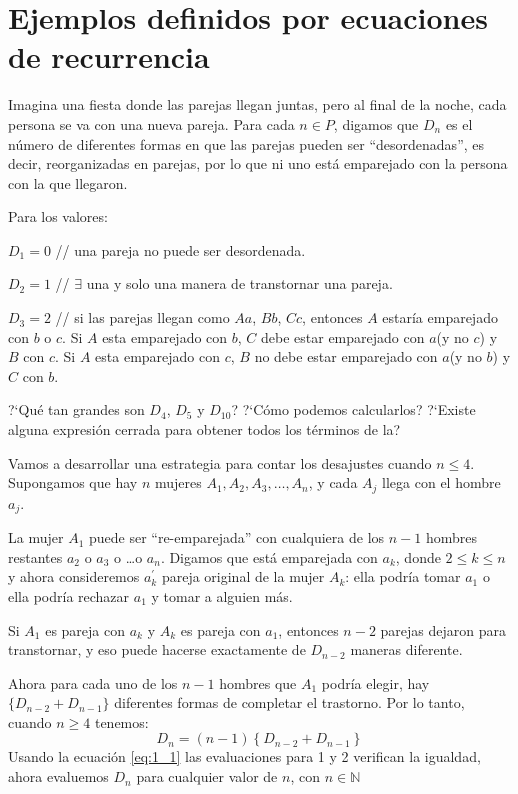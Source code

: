 \section{Ejemplos definidos por ecuaciones de recurrencia}
\begin{example}{}
	Imagina una fiesta donde las parejas llegan juntas, pero al final de la noche, cada persona se va con una nueva pareja. Para cada $n\in P$, digamos que $D_{n}$ es el número de diferentes formas en que las parejas pueden ser ``desordenadas'', es decir, reorganizadas en parejas, por lo que ni uno está emparejado con la persona con la que llegaron.

	Para los valores:

	$D_{1} = 0$  // una pareja no puede ser desordenada.

	$D_{2} = 1$  // $\exists$ una y solo una manera de transtornar una pareja.

	$D_{3} = 2$  // si las parejas llegan como $Aa$, $Bb$, $Cc$, entonces $A$ estaría emparejado con $b$ o $c$. Si $A$ esta emparejado con $b$, $C$ debe estar emparejado con $a$(y no $c$) y $B$ con $c$. Si $A$ esta emparejado con $c$, $B$ no debe estar emparejado con $a$(y no $b$) y $C$ con $b$.

	?`Qué tan grandes son $D_{4}$, $D_{5}$ y $D_{10}$? ?`Cómo podemos calcularlos? ?`Existe alguna expresión cerrada para obtener todos los términos de la? %

	Vamos a desarrollar una estrategia para contar los desajustes cuando $n\leq4$. Supongamos que hay $n$ mujeres $A_{1},A_{2},A_{3},\ldots,A_{n}$, y cada $A_{j}$ llega con el hombre $a_{j}$.

	La mujer $A_{1}$ puede ser ``re-emparejada'' con cualquiera de los $n-1$ hombres restantes $a_{2}$ o $a_{3}$ o \ldots o $a_{n}$. Digamos que está emparejada con $a_{k}$, donde $2\leq k\leq n$ y ahora consideremos $a_{k}^{\prime}$ pareja original de la mujer $A_{k}$: ella podría tomar $a_{1}$ o ella podría rechazar $a_{1}$ y tomar a alguien más.
	
	Si $A_{1}$ es pareja con $a_{k}$ y $A_{k}$ es pareja con $a_{1}$, entonces $n-2$ parejas dejaron para transtornar, y eso puede hacerse exactamente de $D_{n-2}$ maneras diferente.

	Ahora para cada uno de los $n-1$ hombres que $A_{1}$ podría elegir, hay $\{D_{n-2}+ D_{n-1}\}$ diferentes formas de completar el trastorno. Por lo tanto, cuando $n\geq 4$ tenemos:
\begin{equation*}\label{eq:1_1}
D_{n}=\left(n-1\right)\left\{D_{n-2}+D_{n-1}\right\}%
\end{equation*}
Usando la ecuación \eqref{eq:1_1} las evaluaciones para 1 y 2 verifican la igualdad, ahora evaluemos $D_{n}$ para cualquier valor de $n$, con $n\in\mathds{N}$


\end{example}
